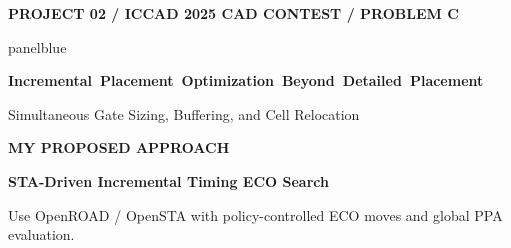 \documentclass[aspectratio=169,10pt]{beamer}
\newcommand{\smalllabel}[1]{{\scriptsize\bfseries\color{Accent}\MakeUppercase{#1}}}
\newcommand{\slidenavigation}{}
\newcommand{\slideposition}{}
\begin{document}
{
\renewcommand{\slidenavigation}{\hyperlink{details-index}{\beamerbutton{Details index}}\hspace{.12cm}\hyperlink{detail-pd-flow}{\beamerbutton{PD Flow}}}
\renewcommand{\slideposition}{Summary 13 / 18}
\begin{frame}[plain,label=summary-13]
  \vfill
  \smalllabel{Project 02 / ICCAD 2025 CAD Contest / Problem C}\par
  \vspace{.40cm}
  \begin{beamercolorbox}[rounded=true,sep=.25cm,wd=\linewidth]{panelblue}
    {\fontsize{13.6}{17}\selectfont\bfseries\color{Ink}
    \mbox{Incremental Placement Optimization Beyond Detailed Placement}\par}
    \vspace{.14cm}
    {\normalsize\color{Ink}
      Simultaneous Gate Sizing, Buffering, and Cell Relocation\par}
  \end{beamercolorbox}
  \vspace{.80cm}
  \smalllabel{My Proposed Approach}\par
  \vspace{.17cm}
  {\fontsize{18}{23}\selectfont\bfseries\color{Accent}
    STA-Driven Incremental Timing ECO Search\par}
  \vspace{.18cm}
  {\small\color{Muted}
    Use OpenROAD / OpenSTA with policy-controlled ECO moves and global PPA evaluation.\par}
  \vfill
\end{frame}}
\renewcommand{\slidenavigation}{\hyperlink{details-index}{\beamerbutton{Details index}}\hspace{.12cm}\hyperlink{detail-quality}{\beamerbutton{QoR scoring}}\hspace{.12cm}\hyperlink{detail-pd-flow}{\beamerbutton{PD Flow}}}
\end{document}
